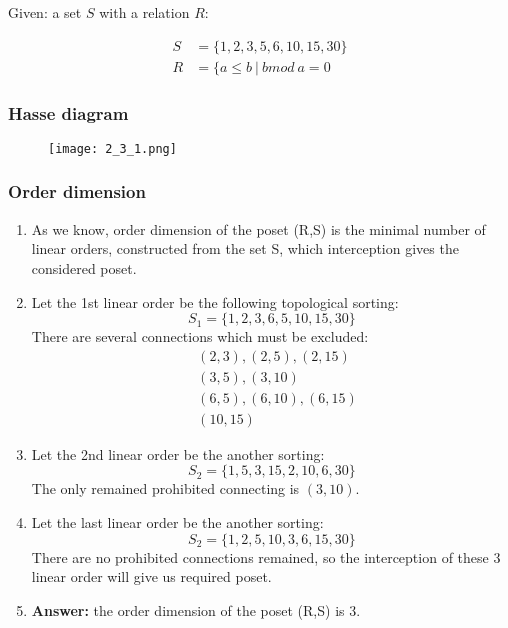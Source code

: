 Given: a set $S$ with a relation $R$:

\begin{align*}
S &= \{1,2,3,5,6,10,15,30\} \\
R &= \{ a \leq b\ |\ b mod\ a = 0
\end{align*}

\subsubsection{Hasse diagram}
\begin{figure}[h]
\centering
\texttt{[image: 2\_3\_1.png]}
\end{figure}

\subsubsection{Order dimension}

\begin{enumerate}
\item As we know, order dimension of the poset (R,S) is the minimal number of linear orders, constructed from the set S, which interception gives the considered poset.
\item Let the 1st linear order be the following topological sorting:
\[ S_1 = \{1,2,3,6,5,10,15,30\} \]
There are several connections which must be excluded:
\begin{align*}
&(2,3),(2,5),(2,15)\\
&(3,5),(3,10) \\
&(6,5),(6,10),(6,15)\\
&(10,15)
\end{align*}
\item Let the 2nd linear order be the another sorting:
\[S_2 = \{1,5,3,15,2,10,6,30\}\]
The only remained prohibited connecting is $(3,10)$.
\item Let the last linear order be the another sorting:
\[S_2 = \{1,2,5,10,3,6,15,30\}\]
There are no prohibited connections remained, so the interception of these 3 linear order will give us required poset.
\item \textbf{Answer:} the order dimension of the poset (R,S) is 3.
\end{enumerate}
